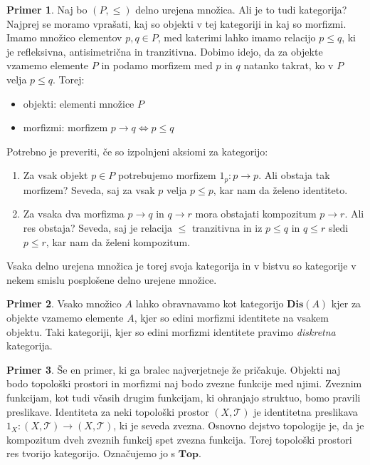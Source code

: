 \documentclass[12pt,a4paper]{book}
\theoremstyle{definition}
\theoremstyle{plain}
\theoremstyle{definition}
\newtheorem{primer}{Primer}[section]
\theoremstyle{remark}
\newcommand{\cat}[1]{\textbf{#1}}
\begin{document}
\begin{primer}
Naj bo $(P, \leq)$ delno urejena množica. Ali je to tudi kategorija? Najprej se moramo vprašati, kaj so objekti v tej kategoriji in kaj so morfizmi.
Imamo množico elementov $p,q \in P$, med katerimi lahko imamo relacijo $p \leq q$, ki je refleksivna, antisimetrična in tranzitivna. Dobimo idejo, da za objekte vzamemo elemente $P$ in podamo morfizem med $p$ in $q$ natanko takrat, ko v $P$ velja $p \leq q$.
Torej: 
\begin{itemize}
\item objekti: elementi množice $P$
\item morfizmi: morfizem $p \rightarrow q \Leftrightarrow p \leq q$
\end{itemize}
Potrebno je preveriti, če so izpolnjeni aksiomi za kategorijo:

\begin{enumerate}
\item Za vsak objekt $p \in P$ potrebujemo morfizem $1_p : p \to p$. Ali obstaja tak morfizem? Seveda, saj za vsak $p$ velja $p \leq p$, kar nam da želeno identiteto.
\item Za vsaka dva morfizma $p \to q$ in $q \to r$ mora obstajati kompozitum $p \to r$. Ali res obstaja? Seveda, saj je relacija $\leq$ tranzitivna in iz $p \leq q$ in $q \leq r$ sledi $p \leq r$, kar nam da želeni kompozitum.
\end{enumerate}
Vsaka delno urejena množica je torej svoja kategorija in v bistvu so kategorije v nekem smislu posplošene delno urejene množice.
\end{primer}



\begin{primer}
Vsako množico $A$ lahko obravnavamo kot kategorijo $\cat{Dis}(A)$ kjer za objekte vzamemo elemente $A$, kjer so edini morfizmi identitete na vsakem objektu. Taki kategoriji, kjer so edini morfizmi identitete pravimo \emph{diskretna} kategorija.
\end{primer}

\begin{primer}
Še en primer, ki ga bralec najverjetneje že pričakuje. Objekti naj bodo topološki prostori in morfizmi naj bodo zvezne funkcije med njimi. Zveznim funkcijam, kot tudi včasih drugim funkcijam, ki ohranjajo struktuo, bomo pravili preslikave. Identiteta za neki topološki prostor $(X, \mathcal{T})$ je identitetna preslikava $1_X : (X, \mathcal{T}) \to (X, \mathcal{T})$, ki je seveda zvezna. Osnovno dejstvo topologije je, da je kompozitum dveh zveznih funkcij spet zvezna funkcija. Torej topološki prostori res tvorijo kategorijo. Označujemo jo s $\cat{Top}$.
\end{primer}
\end{document}
